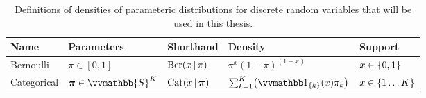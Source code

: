 
\begin{landscape}
\vspace*{-8mm}
\begin{table}[H]
\centering
\begin{tabular}{p{4cm}p{5cm}lll}
\toprule
  \textsf{Name} & \textsf{Parameters} & \textsf{Shorthand} & \textsf{Density} & Support \\
\midrule
  Bernoulli & 
  $\pi \in [0,1]$ &
  $\textrm{Ber}(x \operatorname{|} \pi)$ & 
  $\pi^x (1 -\pi)^{(1-x)}$ &
  $x \in \fset{0,1}$\\
  Categorical & 
  $\vct{\pi} \in \vvmathbb{S}^K$ &
  $\textrm{Cat}(x \operatorname{|} \boldsymbol{\pi})$ & 
  $\sum_{k=1}^K \lpa \ind{\fset{k}}(x) \pi_k \rpa$ &
  $x \in \fset{1 \dots K}$\\
\bottomrule
\end{tabular}
\caption[Standard discrete density definitions.]{Definitions of densities of parameteric distributions for discrete random variables that will be used in this thesis.}
\label{tab:standard-distributions-discrete}
\end{table}


\end{landscape}
